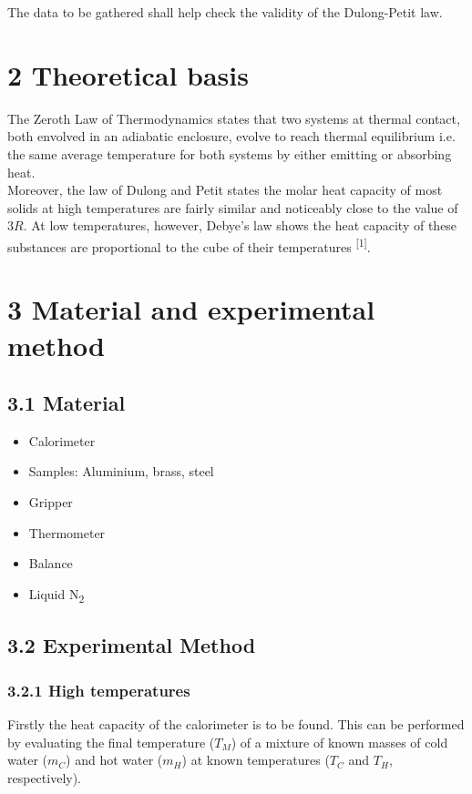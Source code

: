 \documentclass[a4paper, 12pt]{article}
\begin{document}
	The data to be gathered shall help check the validity of the Dulong-Petit law.
	\section{2 Theoretical basis}
	The Zeroth Law of Thermodynamics states that two systems at thermal contact, both envolved in an adiabatic enclosure, evolve to reach thermal equilibrium i.e. the same average temperature for both systems by either emitting or absorbing heat. \\
	
	Moreover, the law of Dulong and Petit states the molar heat capacity of most solids at high temperatures are fairly similar and noticeably close to the value of $3R$. At low temperatures, however, Debye's law shows the heat capacity of these substances are proportional to the cube of their temperatures \textsuperscript{[1]}.
	
	\section{3 Material and experimental method}
	\subsection{3.1 Material}
	\begin{itemize}
		\item Calorimeter
		\item Samples: Aluminium, brass, steel
		\item Gripper
		\item Thermometer
		\item Balance
		\item Liquid N\textsubscript{2}
	\end{itemize}
	\subsection{3.2 Experimental Method}
	\subsubsection{3.2.1 High temperatures}
	Firstly the heat capacity of the calorimeter is to be found. This can be performed by evaluating the final temperature ($T_M$) of a mixture of known masses of cold water ($m_C$) and hot water ($m_H$) at known temperatures ($T_C$ and $T_H$, respectively). \\
	
\end{document}
